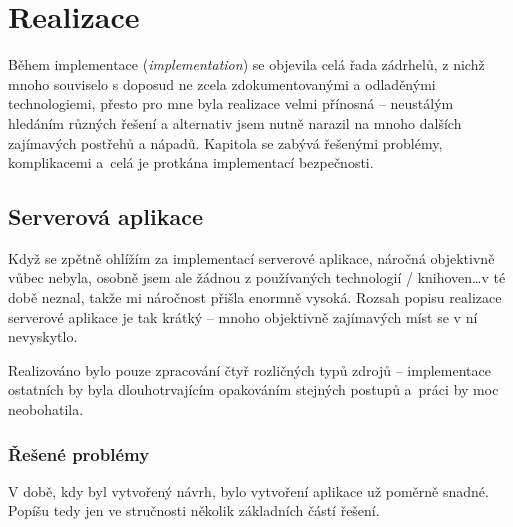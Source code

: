 
\chapter{Realizace}
Během implementace (\textit{implementation}) se objevila celá řada zádrhelů, z nichž mnoho souviselo s doposud ne zcela zdokumentovanými a odladěnými technologiemi, přesto pro mne byla realizace velmi přínosná -- neustálým hledáním různých řešení a alternativ jsem nutně narazil na mnoho dalších zajímavých postřehů a nápadů. Kapitola se zabývá řešenými problémy, komplikacemi a~celá je protkána implementací bezpečnosti. %

\section{Serverová aplikace}
Když se zpětně ohlížím za implementací serverové aplikace, náročná objektivně vůbec nebyla, osobně jsem ale žádnou z používaných technologií / knihoven\dots v té době neznal, takže mi náročnost přišla enormně vysoká. Rozsah popisu realizace serverové aplikace je tak krátký -- mnoho objektivně zajímavých míst se v ní nevyskytlo.

Realizováno bylo pouze zpracování čtyř rozličných typů zdrojů -- implementace ostatních by byla dlouhotrvajícím opakováním stejných postupů a~práci by moc neobohatila.

\subsection{Řešené problémy}
V době, kdy byl vytvořený návrh, bylo vytvoření aplikace už poměrně snadné. Popíšu tedy jen ve stručnosti několik základních částí řešení.

